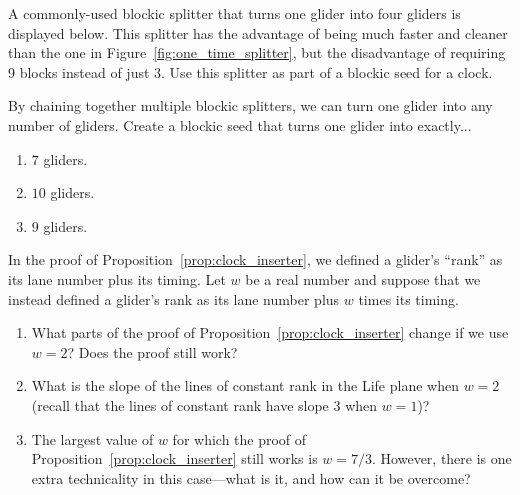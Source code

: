 \begin{multicols}{2}
\begin{problem}\label{exer:new_splitter}
	A commonly-used blockic splitter that turns one glider into four gliders is displayed below. This splitter has the advantage of being much faster and cleaner than the one in Figure~\ref{fig:one_time_splitter}, but the disadvantage of requiring 9 blocks instead of just 3. Use this splitter as part of a blockic seed for a clock.
	\begin{center}
	\end{center}
\end{problem}

\mfilbreak

\begin{problem}\label{exer:blockic_splitter_chain}
	By chaining together multiple blockic splitters, we can turn one glider into any number of gliders. Create a blockic seed that turns one glider into exactly...
	\begin{enumerate}[label=(\alph*)]
		\item $7$ gliders.
		
		\item $10$ gliders.
		
		\item $9$ gliders.
	\end{enumerate}
\end{problem}


\mfilbreak


\begin{problem}\label{exer:slow_salvo_clock_slope}
	In the proof of Proposition~\ref{prop:clock_inserter}, we defined a glider's ``rank'' as its lane number plus its timing. Let $w$ be a real number and suppose that we instead defined a glider's rank as its lane number plus $w$ times its timing.
	\begin{enumerate}[label=(\alph*)]
		\item What parts of the proof of Proposition~\ref{prop:clock_inserter} change if we use $w = 2$? Does the proof still work?
		
		\item What is the slope of the lines of constant rank in the Life plane when $w = 2$ (recall that the lines of constant rank have slope $3$ when $w = 1$)?
		
		\item The largest value of $w$ for which the proof of Proposition~\ref{prop:clock_inserter} still works is $w = 7/3$. However, there is one extra technicality in this case---what is it, and how can it be overcome?
		

\end{enumerate}
\end{problem}
\end{multicols}
